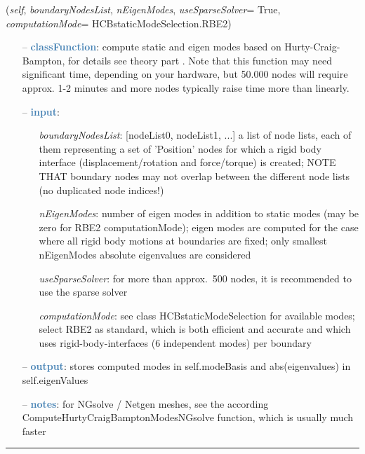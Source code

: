\begin{itemize}[leftmargin=1.4cm]
\begin{itemize}[leftmargin=1.4cm]
\begin{itemize}[leftmargin=0.5cm]
\begin{itemize}[leftmargin=1.4cm]
\begin{itemize}[leftmargin=1.4cm]
\begin{itemize}[leftmargin=0.5cm]
\begin{flushleft}
({\it self}, {\it boundaryNodesList}, {\it nEigenModes}, {\it useSparseSolver}= True, {\it computationMode}= HCBstaticModeSelection.RBE2)
\end{flushleft}
\setlength{\itemindent}{0.7cm}
\begin{itemize}[leftmargin=0.7cm]
  \item[--]  \textcolor{steelblue}{\bf classFunction}: compute static  and eigen modes based on Hurty-Craig-Bampton, for details see theory part . Note that this function may need significant time, depending on your hardware, but 50.000 nodes will require approx. 1-2 minutes and more nodes typically raise time more than linearly.  \item[--]  \textcolor{steelblue}{\bf input}: \vspace{-6pt}
  \begin{itemize}[leftmargin=1.2cm]
\setlength{\itemindent}{-0.7cm}
    \item[] {\it boundaryNodesList}: [nodeList0, nodeList1, ...] a list of node lists, each of them representing a set of 'Position' nodes for which a rigid body interface (displacement/rotation and force/torque) is created; NOTE THAT boundary nodes may not overlap between the different node lists (no duplicated node indices!)
    \item[] {\it   nEigenModes}: number of eigen modes in addition to static modes (may be zero for RBE2 computationMode); eigen modes are computed for the case where all rigid body motions at boundaries are fixed; only smallest nEigenModes absolute eigenvalues are considered
    \item[] {\it   useSparseSolver}: for more than approx.~500 nodes, it is recommended to use the sparse solver
    \item[] {\it   computationMode}: see class HCBstaticModeSelection for available modes; select RBE2 as standard, which is both efficient and accurate and which uses rigid-body-interfaces (6 independent modes) per boundary
  \end{itemize}
  \item[--]  \textcolor{steelblue}{\bf output}: stores computed modes in self.modeBasis and abs(eigenvalues) in self.eigenValues  \item[--]  \textcolor{steelblue}{\bf notes}: for NGsolve / Netgen meshes, see the according ComputeHurtyCraigBamptonModesNGsolve function, which is usually much faster\vspace{12pt}\end{itemize}
%
\noindent\rule{8cm}{0.75pt}\vspace{1pt} \\ 

\end{itemize}
\end{itemize}
\end{itemize}
\end{itemize}
\end{itemize}
\end{itemize}

